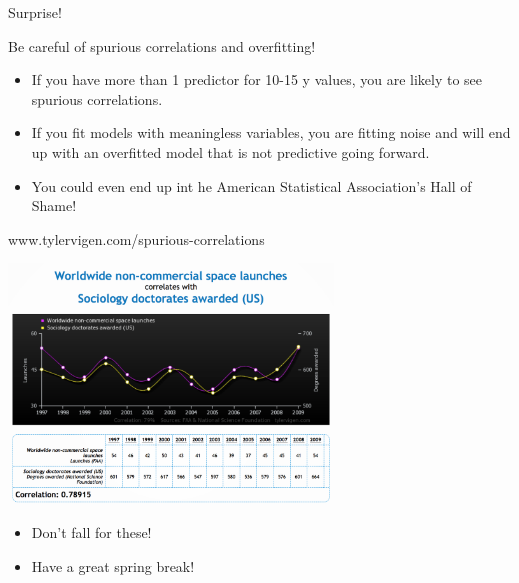 \documentclass{beamer}\usepackage[]{graphicx}\usepackage[]{color}
\begin{document}
\begin{darkframes}
\begin{frame}[fragile]{Surprise!}
     \lc %
    \end{frame}


    \begin{frame}[fragile]{Be careful of spurious correlations and overfitting!}
      \begin{itemize}[<+->]
        \item If you have more than 1 predictor for 10-15 y values, you are likely to see spurious correlations.
        \item If you fit models with meaningless variables, you are fitting noise and will end up with an overfitted model that is not predictive going forward. 
        \item You could even end up int he American Statistical Association's Hall of Shame!
        \end{itemize} 
    \end{frame}


    \begin{frame}{www.tylervigen.com/spurious-correlations}
      \fontsize{10}{10}\selectfont
      \begin{center}
        \includegraphics[width=3.4in]{SociologyDoctorates.png} \\
      \end{center}

      \begin{itemize}
        \item Don't fall for these!
        \item Have a great spring break!
      \end{itemize}
      
    \end{frame}

  \end{darkframes}
\end{document}
